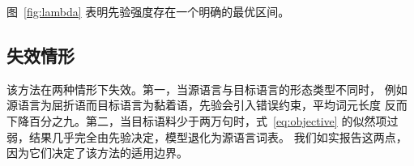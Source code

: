 图~\ref{fig:lambda} 表明先验强度存在一个明确的最优区间。

\subsection{失效情形}

该方法在两种情形下失效。第一，当源语言与目标语言的形态类型不同时，
例如源语言为屈折语而目标语言为黏着语，先验会引入错误约束，平均词元长度
反而下降百分之九。第二，当目标语料少于两万句时，式~\eqref{eq:objective}
的似然项过弱，结果几乎完全由先验决定，模型退化为源语言词表。
我们如实报告这两点，因为它们决定了该方法的适用边界。
